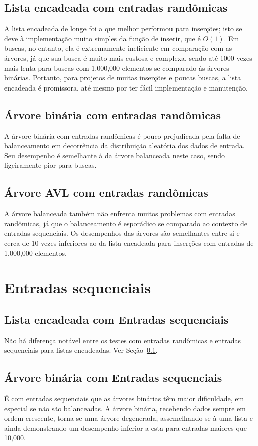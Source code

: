 \subsection{Lista encadeada com entradas randômicas}\label{sub_lista_entrada_r}
A lista encadeada de longe foi a que melhor performou para inserções; isto se deve à implementação muito simples da função de inserir, que é $O(1)$.
Em buscas, no entanto, ela é extremamente ineficiente em comparação com as árvores, já que sua busca é muito mais custosa e complexa, sendo até 1000 vezes mais lenta para buscas com 1,000,000 elementos se comparado às árvores binárias.
Portanto, para projetos de muitas inserções e poucas buscas, a lista encadeada é promissora, até mesmo por ter fácil implementação e manutenção.

\subsection{Árvore binária com entradas randômicas}
A árvore binária com entradas randômicas é pouco prejudicada pela falta de balanceamento em decorrência da distribuição aleatória dos dados de entrada. Seu desempenho é semelhante à da árvore balanceada neste caso, sendo ligeiramente pior para buscas.

\subsection{Árvore AVL com entradas randômicas}
A árvore balanceada também não enfrenta muitos problemas com entradas randômicas, já que o balanceamento é esporádico se comparado ao contexto de entradas sequenciais.
Os desempenhos das árvores são semelhantes entre si e cerca de 10 vezes inferiores ao da lista encadeada para inserções com entradas de 1,000,000 elementos.

\section{Entradas sequenciais}

\subsection{Lista encadeada com Entradas sequenciais}
Não há diferença notável entre os testes com entradas randômicas e entradas sequenciais para listas encadeadas.
Ver Seção~\ref{sub_lista_entrada_r}.

\subsection{Árvore binária com Entradas sequenciais}
É com entradas sequenciais que as árvores binárias têm maior dificuldade, em especial se não são balanceadas.
A árvore binária, recebendo dados sempre em ordem crescente, torna-se uma árvore degenerada, assemelhando-se à uma lista e ainda demonstrando um desempenho inferior a esta para entradas maiores que 10,000.


